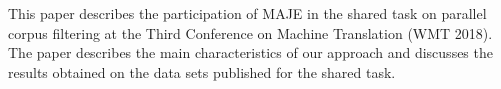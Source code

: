 This paper describes the participation of MAJE in the shared task on parallel corpus filtering at the Third Conference on Machine Translation (WMT 2018). The paper describes the main characteristics of our approach and discusses the results obtained on the data sets published for the shared task.
